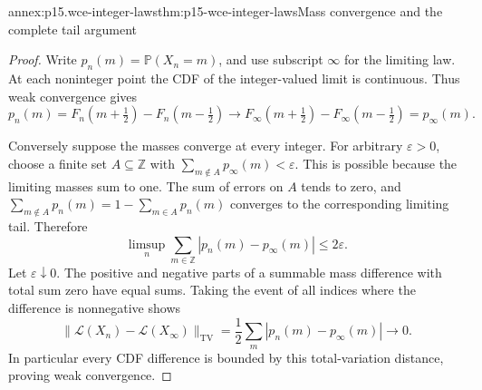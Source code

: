 \begin{annexitem}{annex:p15.wce-integer-laws}{thm:p15-wce-integer-laws}{Mass convergence and the complete tail argument}
\begin{proof}
Write \(p_n(m)=\mathbb P(X_n=m)\), and use subscript
\(\infty\) for the limiting law. At each noninteger point
the CDF of the integer-valued limit is continuous. Thus weak
convergence gives
\[
 p_n(m)=F_n(m+\tfrac12)-F_n(m-\tfrac12)
        \longrightarrow
        F_\infty(m+\tfrac12)-F_\infty(m-\tfrac12)=p_\infty(m).
 \]

Conversely suppose the masses converge at every integer.
For arbitrary \(\varepsilon>0\), choose a finite set
\(A\subseteq\mathbb Z\) with
\(\sum_{m\notin A}p_\infty(m)<\varepsilon\).
This is possible because the limiting masses sum to one.
The sum of errors on \(A\) tends to zero, and
\(\sum_{m\notin A}p_n(m)=1-\sum_{m\in A}p_n(m)\)
converges to the corresponding limiting tail.
Therefore
\[
 \limsup_n\sum_{m\in\mathbb Z}|p_n(m)-p_\infty(m)|
 \leq2\varepsilon.
 \]
Let \(\varepsilon\downarrow0\).
The positive and negative parts of a summable mass difference
with total sum zero have equal sums. Taking the event of all
indices where the difference is nonnegative shows
\[
 \|\mathcal L(X_n)-\mathcal L(X_\infty)\|_{\mathrm{TV}}
       =\frac12\sum_m|p_n(m)-p_\infty(m)|\longrightarrow0.
 \]
In particular every CDF difference is bounded by this
total-variation distance, proving weak convergence.
\end{proof}
\end{annexitem}

